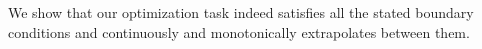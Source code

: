 We show that our optimization task indeed satisfies all the stated boundary conditions and continuously and monotonically extrapolates between them. 


